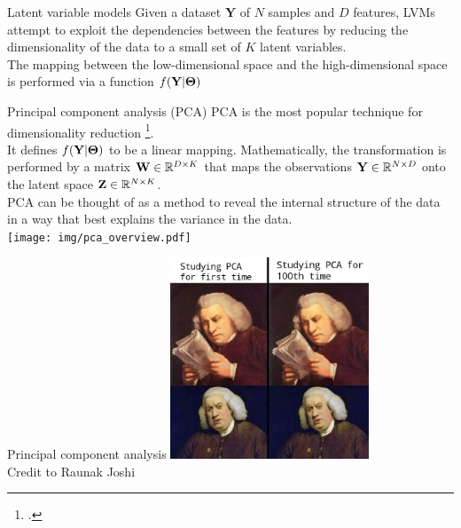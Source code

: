 \documentclass[aspectratio=169,notes]{beamer}
\begin{document}
	\begin{frame}{Latent variable models}
	Given a dataset $\mathbf{Y}$ of $N$ samples and $D$ features, LVMs attempt to exploit the dependencies between the features by reducing the dimensionality of the data to a small set of $K$ latent variables.\\

	The mapping between the low-dimensional space and the high-dimensional space is performed via a function $f({\bf Y}|\mbox{\boldmath $\Theta$})$
	\end{frame}

	\begin{frame}{Principal component analysis (PCA)}
	PCA is the most popular technique for dimensionality reduction \footcite{Hotelling1933,Ringner2008}.\\
	It defines $f({\bf Y}|\mbox{\boldmath $\Theta$})$ to be a linear mapping. Mathematically, the transformation is performed by a matrix ${\bf W} \in \mathbb{R}^{D \times K}$ that maps the observations ${\bf Y} \in \mathbb{R}^{N \times D}$ onto the latent space ${\bf Z} \in \mathbb{R}^{N \times K}$.\\
	PCA can be thought of as a method to reveal the internal structure of the data in a way that best explains the variance in the data.\\ \leavevmode\newline
	\centering
	\texttt{[image: img/pca\_overview.pdf]}
	\end{frame}

	\begin{frame}{Principal component analysis}
	\centering
	\includegraphics[height=6cm]{img/pca.jpeg}\\
  	\tiny Credit to Raunak Joshi \par
	\end{frame}
\end{document}
